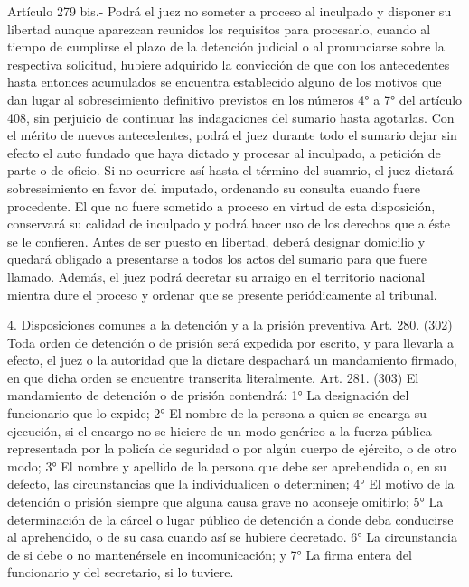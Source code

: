     Artículo 279 bis.- Podrá el juez no someter a proceso al inculpado y disponer su libertad aunque aparezcan reunidos los requisitos para procesarlo, cuando al tiempo de cumplirse el plazo de la detención judicial o al pronunciarse sobre la respectiva solicitud, hubiere adquirido la convicción de que con los antecedentes hasta entonces acumulados se encuentra establecido alguno de los motivos que dan lugar al sobreseimiento definitivo previstos en los números 4° a 7° del artículo 408, sin perjuicio de continuar las indagaciones del sumario hasta agotarlas.
    Con el mérito de nuevos antecedentes, podrá el juez durante todo el sumario dejar sin efecto el auto fundado que haya dictado y procesar al inculpado, a petición de parte o de oficio. Si no ocurriere así hasta el término del suamrio, el juez dictará sobreseimiento en favor del imputado, ordenando su consulta cuando fuere procedente.
    El que no fuere sometido a proceso en virtud de esta disposición, conservará su calidad de inculpado y podrá hacer uso de los derechos que a éste se le confieren. Antes de ser puesto en libertad, deberá designar domicilio y quedará obligado a presentarse a todos los actos del sumario para que fuere llamado.
    Además, el juez podrá decretar su arraigo en el territorio nacional mientra dure el proceso y ordenar que se presente periódicamente al tribunal.

    4. Disposiciones comunes a la detención y a la
prisión preventiva
    Art. 280. (302) Toda orden de detención o de prisión será expedida por escrito, y para llevarla a efecto, el juez o la autoridad que la dictare despachará un mandamiento firmado, en que dicha orden se encuentre transcrita literalmente.
    Art. 281. (303) El mandamiento de detención o de prisión contendrá:
    1° La designación del funcionario que lo expide;
    2° El nombre de la persona a quien se encarga su ejecución, si el encargo no se hiciere de un modo genérico a la fuerza pública representada por la policía de seguridad o por algún cuerpo de ejército, o de otro modo;
    3° El nombre y apellido de la persona que debe ser aprehendida o, en su defecto, las circunstancias que la individualicen o determinen;
    4° El motivo de la detención o prisión siempre que alguna causa grave no aconseje omitirlo;
    5° La determinación de la cárcel o lugar público de detención a donde deba conducirse al aprehendido, o de su casa cuando así se hubiere decretado.
      6° La circunstancia de si debe o no mantenérsele en incomunicación; y
    7° La firma entera del funcionario y del secretario, si lo tuviere.

